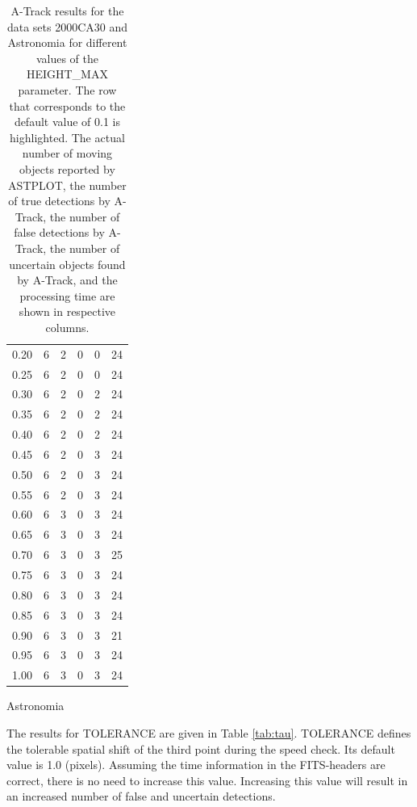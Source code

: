 \documentclass[review]{elsarticle}
\begin{document}
\begin{table}[H]
\begin{subtable}[h]{0.45\textwidth}
{\begin{tabular}{@{}>{\Large}c>{\Large}c>{\Large}c>{\Large}c>{\Large}c>{\Large}c@{}}
			0.20 & 6 & 2 & 0 & 0 & 24 \\
			0.25 & 6 & 2 & 0 & 0 & 24 \\
			0.30 & 6 & 2 & 0 & 2 & 24 \\
			0.35 & 6 & 2 & 0 & 2 & 24 \\
			0.40 & 6 & 2 & 0 & 2 & 24 \\
			0.45 & 6 & 2 & 0 & 3 & 24 \\
			0.50 & 6 & 2 & 0 & 3 & 24 \\
			0.55 & 6 & 2 & 0 & 3 & 24 \\
			0.60 & 6 & 3 & 0 & 3 & 24 \\
			0.65 & 6 & 3 & 0 & 3 & 24 \\
			0.70 & 6 & 3 & 0 & 3 & 25 \\
			0.75 & 6 & 3 & 0 & 3 & 24 \\
			0.80 & 6 & 3 & 0 & 3 & 24 \\
			0.85 & 6 & 3 & 0 & 3 & 24 \\
			0.90 & 6 & 3 & 0 & 3 & 21 \\
			0.95 & 6 & 3 & 0 & 3 & 24 \\
			1.00 & 6 & 3 & 0 & 3 & 24 \\
        \end{tabular}
        }
        \caption{Astronomia}
        \label{tab:astronomia_hmax}
    \end{subtable}
    \caption{A-Track results for the data sets 2000CA30 and Astronomia for different values of the HEIGHT\_MAX parameter. The row that corresponds to the default value of 0.1 is highlighted. The actual number of moving objects reported by ASTPLOT, the number of true detections by A-Track, the number of false detections by A-Track, the number of uncertain objects found by A-Track, and the processing time are shown in respective columns.}
    \label{tab:heightmax}
\end{table}

The results for TOLERANCE are given in Table \ref{tab:tau}. TOLERANCE defines the tolerable spatial shift of the third point during the speed check. Its default value is 1.0 (pixels). Assuming the time information in the FITS-headers are correct, there is no need to increase this value. Increasing this value will result in an increased number of false and uncertain detections.
\end{document}
